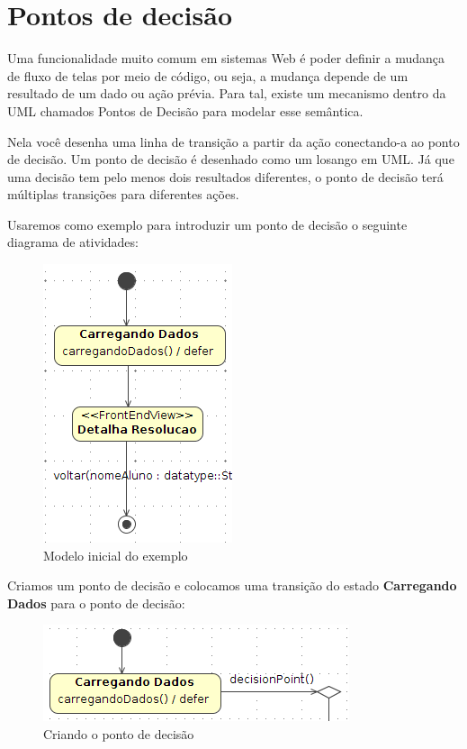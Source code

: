 \section{Pontos de decisão}

Uma funcionalidade muito comum em sistemas Web é poder definir a mudança de fluxo de telas por meio de código, ou seja, a mudança depende de um resultado de um dado ou ação prévia. Para tal, existe um mecanismo dentro da UML chamados Pontos de Decisão para modelar esse semântica.

Nela você desenha uma linha de transição a partir da ação conectando-a ao ponto
de decisão. Um ponto de decisão é desenhado como um losango em UML. Já que uma
decisão tem pelo menos dois resultados diferentes, o ponto de decisão terá
múltiplas transições para diferentes ações.

Usaremos como exemplo para introduzir um ponto de decisão o seguinte diagrama de
atividades:

\begin{figure}[H]
	\centering
	\includegraphics[scale=0.75]{files/imgs/decision-point-00.png}
	\caption{Modelo inicial do exemplo}
	\label{modelo_inicial_ponto_decisao}
\end{figure}

Criamos um ponto de decisão e colocamos uma transição do estado
\textbf{Carregando Dados} para o ponto de decisão:

\begin{figure}[H]
	\centering
	\includegraphics[scale=0.75]{files/imgs/decision-point-01.png}
	\caption{Criando o ponto de decisão}
	\label{criando_ponto_decisao}
\end{figure}

